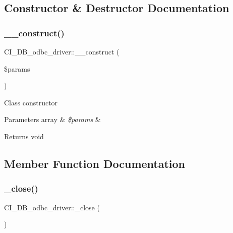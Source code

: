 \subsection{Constructor \& Destructor Documentation}
\mbox{\label{class_c_i___d_b__odbc__driver_a1a5710dfc68a455b9e5c39980e8c5daa}} 
\subsubsection{\texorpdfstring{\+\_\+\+\_\+construct()}{\_\_construct()}}
{\footnotesize\ttfamily C\+I\+\_\+\+D\+B\+\_\+odbc\+\_\+driver\+::\+\_\+\+\_\+construct (\begin{DoxyParamCaption}\item[{}]{\$params }\end{DoxyParamCaption})}

Class constructor


\begin{DoxyParams}[1]{Parameters}
array & {\em \$params} & \\
\hline
\end{DoxyParams}
\begin{DoxyReturn}{Returns}
void 
\end{DoxyReturn}


\subsection{Member Function Documentation}
\mbox{\label{class_c_i___d_b__odbc__driver_acc26fae36c67ad8489dcafa939ed287e}} 
\subsubsection{\texorpdfstring{\+\_\+close()}{\_close()}}
{\footnotesize\ttfamily C\+I\+\_\+\+D\+B\+\_\+odbc\+\_\+driver\+::\+\_\+close (\begin{DoxyParamCaption}{ }\end{DoxyParamCaption})\hspace{0.3cm}{\ttfamily [protected]}}

